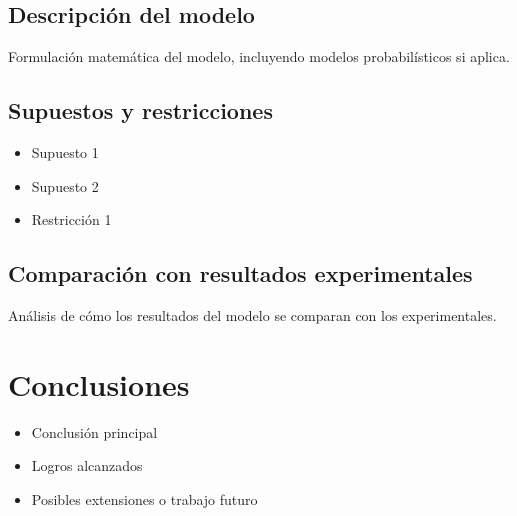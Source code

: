 \documentclass[12pt, a4paper]{article}
\begin{document}
\subsection*{Descripción del modelo}
Formulación matemática del modelo, incluyendo modelos probabilísticos si aplica.

\subsection*{Supuestos y restricciones}
\begin{itemize}
    \item Supuesto 1
    \item Supuesto 2
    \item Restricción 1
\end{itemize}

\subsection*{Comparación con resultados experimentales}
Análisis de cómo los resultados del modelo se comparan con los experimentales.

\section{Conclusiones} \label{S5}
\begin{itemize}
    \item Conclusión principal
    \item Logros alcanzados
    \item Posibles extensiones o trabajo futuro
\end{itemize}
\end{document}
